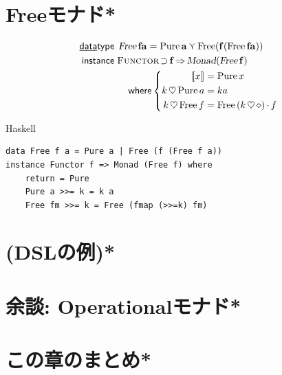 \documentclass[a5paper,twoside,fleqn,draft]{jsbook}
\def\[{[\![}
\def\]{]\!]}
\newcommand{\programminglanguage}[1]{\textsf{#1}}
\newcommand{\haskell}{\programminglanguage{Haskell}}
\newenvironment{haskellcode}{\begin{itembox}[r]{\haskell}}{\end{itembox}}
\newcommand{\mKeyword}[1]{\mathsf{#1}}
\newcommand{\mKeywordUnderline}[1]{\text{\underline{\textsf{#1}}}}
\newcommand{\mDataTypeKeyword}{\mKeywordUnderline{data}\mKeyword{type}}
\newcommand{\mInstanceDeclKeyword}{\mKeyword{instance}}
\newcommand{\mWhereKeyword}{\mKeyword{where}}
\DeclareMathOperator{\mDataType}{\mDataTypeKeyword}
\DeclareMathOperator{\mInstanceDecl}{\mInstanceDeclKeyword}
\DeclareMathOperator{\mSuperClass}{\Rightarrow}
\DeclareMathOperator{\mSuperSet}{\supset}
\DeclareMathOperator{\mWhere}{\mWhereKeyword}
\newcommand{\mAnonParam}{\diamond}
\DeclareMathOperator{\mBind}{\heartsuit}
\DeclareMathOperator{\mMap}{\cdot}
\DeclareMathOperator{\mValueOr}{\curlyvee}
\newcommand{\mType}[1]{\mathbf{#1}} %
\newcommand{\mA}{\mType{a}}
\newcommand{\mTypeConstructor}[1]{\textsl{#1}}
\newcommand{\mValueConstructor}[1]{\mathrm{#1}}
\newcommand{\mValueWith}[2]{\mValueConstructor{#1}\,#2}
\newcommand{\mPureWith}[1]{\[#1\]}
\newcommand{\mTypeClass}[1]{\textsc{#1}} %
\newcommand{\mFunctorTypeClass}{\mTypeClass{Functor}}
\begin{document}
\section{Freeモナド*}
\begin{align}
\mDataType\;&\mathop{\mTypeConstructor{Free}}\mType{f}\mA =\mathop{\mValueConstructor{Pure}}\mA \mValueOr\mathop{\mValueConstructor{Free}(\mType{f}(\mathop{\mValueConstructor{Free}}\mType{f}\mA ))}\\
\mInstanceDecl\;&\mFunctorTypeClass\mSuperSet\mType{f}\mSuperClass\mTypeConstructor{Monad}(\mathop{\mTypeConstructor{Free}}\mType{f})\nonumber\\
&\quad\mWhere\left\{
\begin{aligned}
\mPureWith{x}&=\mValueWith{Pure}{x}\\
k\mBind\mValueWith{Pure}{a}&=ka\\
k\mBind\mValueWith{Free}{f}&=\mValueWith{Free}{(k\mBind\mAnonParam)\mMap f}
\end{aligned}
\right.
\end{align}

\begin{haskellcode}
\begin{verbatim}
data Free f a = Pure a | Free (f (Free f a))
instance Functor f => Monad (Free f) where
    return = Pure
    Pure a >>= k = k a
    Free fm >>= k = Free (fmap (>>=k) fm)
\end{verbatim}
\end{haskellcode}

\section{(DSLの例)*}
\section{余談: Operationalモナド*}
\section{この章のまとめ*}


\end{document}
